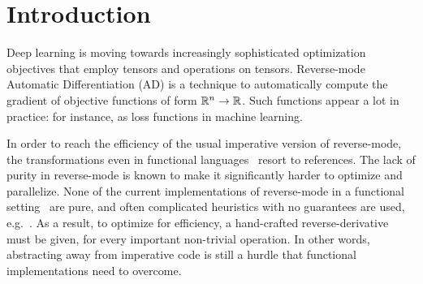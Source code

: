 \section{Introduction}
\label{sec:intro}



Deep learning is moving towards increasingly sophisticated optimization objectives that employ tensors and operations on tensors.
Reverse-mode Automatic Differentiation (AD) is a technique to automatically compute the gradient of objective functions of form $\mathbb{R}^n\to\mathbb{R}$.
Such functions appear a lot in practice: for instance, as loss functions in machine learning.

In order to reach the efficiency of the usual imperative version of reverse-mode, the transformations even in functional languages~\cite{pearlmutter2008reverse} resort to references.
The lack of purity in reverse-mode is known to make it significantly harder to optimize and parallelize. 
None of the current implementations of reverse-mode in a functional setting~\cite{lantern_icfp,pearlmutter2008reverse,baydin2016diffsharp} are pure, and often complicated heuristics with no guarantees are used, e.g.~\cite{xla}.
As a result, to optimize for efficiency, a hand-crafted reverse-derivative must be given, for every important non-trivial operation.
In other words, abstracting away from imperative code is still a hurdle that functional implementations need to overcome.

